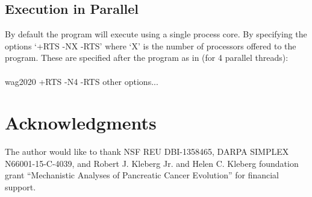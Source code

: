\documentclass[11pt]{memoir}
\begin{document}
	
	\subsection{Execution in Parallel}
	By default the program will execute using a single process core.  By specifying the options `+RTS -NX -RTS' where `X' is the number of processors offered to the program. These are specified after the program as in (for 4 parallel threads):\\
	\\
	wag2020 +RTS -N4 -RTS other options...  \\
	
	\section*{Acknowledgments}
	The author would like to thank NSF REU DBI-1358465, DARPA SIMPLEX N66001-15-C-4039, and Robert J. Kleberg Jr. and Helen C. Kleberg foundation grant ``Mechanistic Analyses of Pancreatic Cancer Evolution'' for financial support.  
	
	
\end{document}
